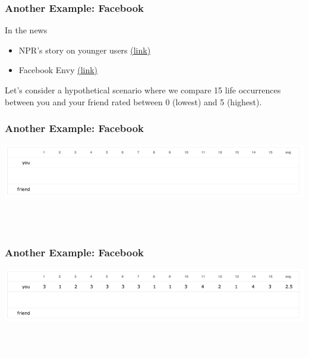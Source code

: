 \documentclass[handout]{beamer}
\newcommand{\blue}[1]{\textcolor{blue2}{#1}}
\begin{document}
\begin{frame}
\frametitle{Another Example: Facebook}

In the news
\begin{itemize}
\item NPR's story on younger users \blue{\href{http://www.npr.org/2014/01/09/261108836/many-younger-facebook-users-unfriend-the-network}{(link)}}
\item Facebook Envy \blue{\href{http://psychcentral.com/blog/archives/2015/04/09/the-psychology-of-facebook-depression-avoid-social-comparisons-envy/}{(link)}}
\end{itemize}

\pause \vspace{1cm}

Let's consider a hypothetical scenario where we compare 15 life occurrences between you and your friend rated between 0 (lowest) and 5 (highest).

\end{frame}


\begin{frame}
\frametitle{Another Example: Facebook}

\begin{center}
\includegraphics[width=\textwidth]{./figure/FB1}
\end{center}

\textcolor{white}{The selective ``Facebook image curation'' your friend performed is a form of selection bias!}

\end{frame}


\begin{frame}
\frametitle{Another Example: Facebook}

\begin{center}
\includegraphics[width=\textwidth]{./figure/FB2}
\end{center}

\textcolor{white}{The selective ``Facebook image curation'' your friend performed is a form of selection bias!}

\end{frame}
\end{document}
